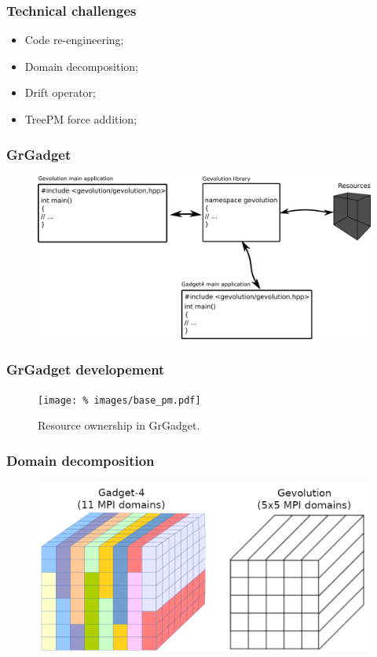 \documentclass{beamer}
\makeatletter
\newcommand{\mylabel}{%
}
\makeatother
\begin{document}
\begin{frame}[label=challenges]
    \frametitle{Technical challenges\mylabel}
    \begin{itemize}
    	\setlength\itemsep{1em}
    	\item Code re-engineering;
	\item Domain decomposition;
	\item Drift operator;
	\item TreePM force addition;
    \end{itemize}
\end{frame}

\begin{frame}[label=codedesign]
    \frametitle{GrGadget\mylabel}
    \begin{figure}
        \includegraphics[width=\textwidth]{images/modular-code.png}
    \end{figure}
\end{frame}
\begin{frame}[label=memorylayout]
    \frametitle{GrGadget developement\mylabel}
    \vspace*{-.5cm}
    \begin{figure}
    \centering\texttt{[image: \%
        images/base\_pm.pdf]}%
        \caption{Resource ownership in GrGadget.}
    \end{figure}
\end{frame}




\begin{frame}[label=meshdomains]
    \frametitle{Domain decomposition\mylabel}
    \begin{figure}
        \centering
        \includegraphics[width=.8\textwidth]{images/domains.png}
    \end{figure}
\end{frame}
\end{document}
